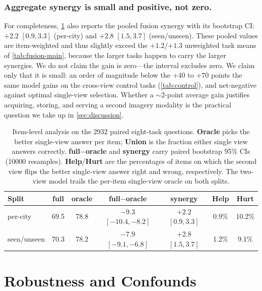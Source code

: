 \documentclass[runningheads]{llncs}
\begin{document}
\subsubsection{Aggregate synergy is small and positive, not zero.}
For completeness, \cref{tab:oracle} also reports the pooled fusion synergy with
its bootstrap CI: $+\num{2.2}$ $[\num{0.9},\num{3.3}]$ (per-city) and $+\num{2.8}$
$[\num{1.5},\num{3.7}]$ (seen/unseen). These pooled values are item-weighted and
thus slightly exceed the $+\num{1.2}$/$+\num{1.3}$ unweighted task means of
\cref{tab:fusion-main}, because the larger tasks happen to carry the larger
synergies. We do not claim the gain is zero---the interval excludes zero. We claim
only that it is small: an order of magnitude below the $+\num{40}$ to $+\num{70}$
points the same model gains on the cross-view control tasks (\cref{tab:control}),
and net-negative against optimal single-view selection. Whether a $\sim$\num{2}-point average gain justifies acquiring,
storing, and serving a second imagery modality is the practical question we take
up in \cref{sec:discussion}.

\begin{table}[t]
  \centering
  \caption{Item-level analysis on the \num{2932} paired eight-task questions.
  \textbf{Oracle} picks the better single-view answer per item; \textbf{Union} is
  the fraction either single view answers correctly. \textbf{full$-$oracle} and
  \textbf{synergy} carry paired bootstrap \num{95}\% CIs (\num{10000} resamples).
  \textbf{Help}/\textbf{Hurt} are the percentages of items on which the second
  view flips the better single-view answer right and wrong, respectively. The
  two-view model trails the per-item single-view oracle on both splits.}
  \label{tab:oracle}
  \setlength{\tabcolsep}{5pt}
  \begin{tabular}{@{}lcccccc@{}}
    \toprule
    Split & full & oracle & full$-$oracle & synergy & Help & Hurt \\
    \midrule
    per-city    & 69.5 & 78.8 & $-9.3$ \footnotesize$[-10.4,-8.2]$ & $+2.2$ \footnotesize$[0.9,3.3]$ & 0.9\% & 10.2\% \\
    seen/unseen & 70.3 & 78.2 & $-7.9$ \footnotesize$[-9.1,-6.8]$ & $+2.8$ \footnotesize$[1.5,3.7]$ & 1.2\% & 9.1\% \\
    \bottomrule
  \end{tabular}
\end{table}

\section{Robustness and Confounds}
\label{sec:robustness}
\end{document}
